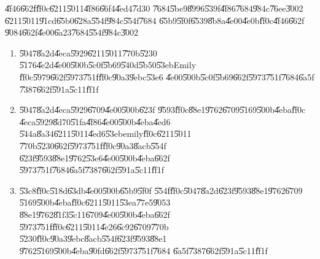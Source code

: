 \documentclass{article}
\begin{document}
\bigskip

\U{4f46}\U{662f}\U{ff0c}\U{6211}\U{5011}\U{4f86}\U{66f4}\U{4ed4}\U{7d30}%
\U{7684}\U{5be9}\U{8996}\U{539f}\U{4f86}\U{7684}\U{984c}\U{76ee}\U{3002}%
\U{6211}\U{5011}\U{91cd}\U{65b0}\U{628a}\U{554f}\U{984c}\U{554f}\U{7684}%
\U{65b9}\U{5f0f}\U{6539}\U{8b8a}\U{4e00}\U{4e0b}\U{ff0c}\U{4f46}\U{662f}%
\U{9084}\U{662f}\U{4e00}\U{6a23}\U{7684}\U{554f}\U{984c}\U{3002}

\begin{enumerate}
\item \U{5047}\U{8a2d}\U{4eca}\U{5929}\U{6211}\U{5011}\U{770b}\U{5230}%
\U{5176}\U{4e2d}\U{4e00}\U{500b}\U{5c0f}\U{5b69}\U{540d}\U{5b50}\U{53eb}Emily%
\U{ff0c}\U{5979}\U{662f}\U{5973}\U{751f}\U{ff0c}\U{90a3}\U{9ebc}\U{53e6}%
\U{4e00}\U{500b}\U{5c0f}\U{5b69}\U{662f}\U{5973}\U{751f}\U{7684}\U{6a5f}%
\U{7387}\U{662f}\U{591a}\U{5c11}\U{ff1f}

\item \U{5047}\U{8a2d}\U{4eca}\U{5929}\U{6709}\U{4e00}\U{500b}\U{623f}%
\U{9593}\U{ff0c}\U{88e1}\U{9762}\U{6709}\U{5169}\U{500b}\U{4eba}\U{ff0c}%
\U{4eca}\U{5929}\U{8d70}\U{51fa}\U{4f86}\U{4e00}\U{500b}\U{4eba}\U{4ed6}%
\U{544a}\U{8a34}\U{6211}\U{5011}\U{4ed6}\U{53eb}emily\U{ff0c}\U{6211}\U{5011}%
\U{770b}\U{5230}\U{662f}\U{5973}\U{751f}\U{ff0c}\U{90a3}\U{8acb}\U{554f}%
\U{623f}\U{9593}\U{88e1}\U{9762}\U{53e6}\U{4e00}\U{500b}\U{4eba}\U{662f}%
\U{5973}\U{751f}\U{7684}\U{6a5f}\U{7387}\U{662f}\U{591a}\U{5c11}\U{ff1f}

\item \U{53c8}\U{ff0c}\U{518d}\U{63db}\U{4e00}\U{500b}\U{65b9}\U{5f0f}%
\U{554f}\U{ff0c}\U{5047}\U{8a2d}\U{623f}\U{9593}\U{88e1}\U{9762}\U{6709}%
\U{5169}\U{500b}\U{4eba}\U{ff0c}\U{6211}\U{5011}\U{53ea}\U{77e5}\U{9053}%
\U{88e1}\U{9762}\U{81f3}\U{5c11}\U{6709}\U{4e00}\U{500b}\U{4eba}\U{662f}%
\U{5973}\U{751f}\U{ff0c}\U{6211}\U{5011}\U{4e26}\U{6c92}\U{6709}\U{770b}%
\U{5230}\U{ff0c}\U{90a3}\U{9ebc}\U{8acb}\U{554f}\U{623f}\U{9593}\U{88e1}%
\U{9762}\U{5169}\U{500b}\U{4eba}\U{90fd}\U{662f}\U{5973}\U{751f}\U{7684}%
\U{6a5f}\U{7387}\U{662f}\U{591a}\U{5c11}\U{ff1f}
\end{enumerate}

\bigskip
\end{document}
